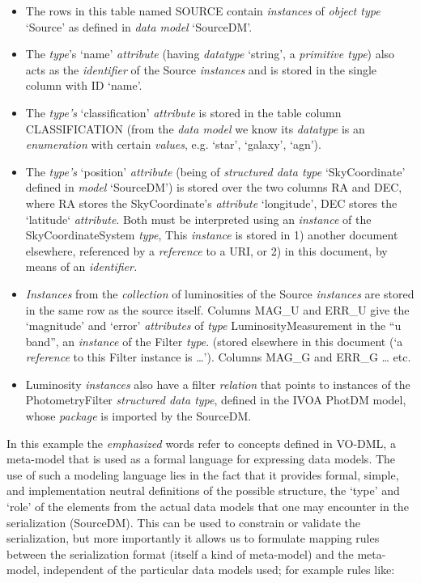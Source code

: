 \documentclass[11pt,a4paper]{ivoa}
\begin{document}
\begin{itemize}
\item
  The rows in this table named SOURCE contain \emph{instances} of
  \emph{object type} `Source' as defined in \emph{data model}
  `SourceDM'.
\item
  The \emph{type}'s `name' \emph{attribute} (having \emph{datatype}
  `string', a \emph{primitive type}) also acts as the \emph{identifier}
  of the Source \emph{instances} and is stored in the single column with
  ID `name'.
\item
  The \emph{type's} `classification' \emph{attribute} is stored in the
  table column CLASSIFICATION (from the \emph{data model} we know its
  \emph{datatype} is an \emph{enumeration} with certain \emph{values},
  e.g. `star', `galaxy', `agn').
\item
  The \emph{type's} `position' \emph{attribute} (being of
  \emph{structured data type} `SkyCoordinate' defined in \emph{model}
  `SourceDM') is stored over the two columns RA and DEC, where RA stores
  the SkyCoordinate's \emph{attribute} `longitude', DEC stores the
  `latitude` \emph{attribute}. Both must be interpreted using an
  \emph{instance} of the SkyCoordinateSystem \emph{type}, This
  \emph{instance} is stored in 1) another document elsewhere, referenced
  by a \emph{reference} to a URI, or 2) in this document, by means of an
  \emph{identifier.}
\item
  \emph{Instances} from the \emph{collection} of luminosities of the
  Source \emph{instances} are stored in the same row as the source
  itself. Columns MAG\_U and ERR\_U give the `magnitude' and `error'
  \emph{attributes} of \emph{type} LuminosityMeasurement in the ``u
  band'', an \emph{instance} of the Filter \emph{type}. (stored
  elsewhere in this document (`a \emph{reference} to this Filter
  instance is \ldots{}'). Columns MAG\_G and ERR\_G \ldots{} etc.
\item
  Luminosity \emph{instances} also have a filter \emph{relation} that
  points to instances of the PhotometryFilter \emph{structured data
  type}, defined in the IVOA PhotDM model, whose \emph{package} is
  imported by the SourceDM.
\end{itemize}

In this example the \emph{emphasized} words refer to concepts defined in
VO-DML, a meta-model that is used as a formal language for expressing
data models. The use of such a modeling language lies in the fact that
it provides formal, simple, and implementation neutral definitions of
the possible structure, the `type' and `role' of the elements from the
actual data models that one may encounter in the serialization
(SourceDM). This can be used to constrain or validate the serialization,
but more importantly it allows us to formulate mapping rules between the
serialization format (itself a kind of meta-model) and the meta-model,
independent of the particular data models used; for example rules like:
\end{document}
